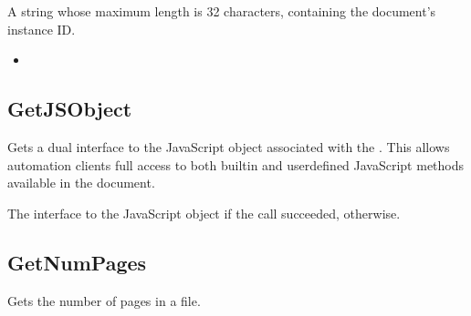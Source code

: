 \documentclass[letterpaper,12pt,english,openany,oneside]{sphinxmanual}
\begin{document}

\begin{sphinxVerbatim}[commandchars=\\\{\}]
 
\end{sphinxVerbatim}


A string whose maximum length is 32 characters, containing the document’s instance ID.

\label{\detokenize{IAC_API_OLE_Objects:related-methods-99}}
\begin{itemize}
\item {} 
 

\end{itemize}




\subsection{GetJSObject}
\label{\detokenize{IAC_API_OLE_Objects:getjsobject}}
Gets a dual interface to the JavaScript object associated with the . This allows automation clients full access to both built\sphinxhyphen{}in and user\sphinxhyphen{}defined JavaScript methods available in the document.


\begin{sphinxVerbatim}[commandchars=\\\{\}]
 
\end{sphinxVerbatim}


The interface to the JavaScript object if the call succeeded,  otherwise.




\subsection{GetNumPages}
\label{\detokenize{IAC_API_OLE_Objects:getnumpages}}
Gets the number of pages in a file.

\end{document}
